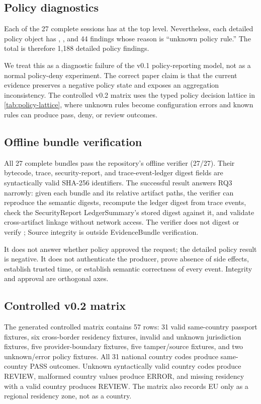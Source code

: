 \subsection{Policy diagnostics}
Each of the 27 complete sessions has  at the top
level.  Nevertheless, each detailed policy object has
, , and 44 findings whose
reason is ``unknown policy rule.''  The total is therefore 1,188 detailed
policy findings.

We treat this as a diagnostic failure of the v0.1 policy-reporting model, not
as a normal policy-deny experiment.  The correct paper claim is that the
current evidence preserves a negative policy state and exposes an aggregation
inconsistency.  The controlled v0.2 matrix uses the typed policy decision
lattice in \cref{tab:policy-lattice}, where unknown rules become configuration
errors and known rules can produce pass, deny, or review outcomes.

\subsection{Offline bundle verification}
All 27 complete bundles pass the repository's offline verifier (27/27).  Their
bytecode, trace, security-report, and trace-event-ledger digest fields are
syntactically valid SHA-256 identifiers.  The successful result answers RQ3
narrowly: given each bundle and its relative artifact paths, the verifier can
reproduce the semantic digests, recompute the ledger digest from trace events,
check the SecurityReport LedgerSummary's stored digest against it, and validate
cross-artifact linkage without network access.  The verifier does not digest
or verify ; Source integrity is outside EvidenceBundle
verification.

It does not answer whether policy approved the request; the detailed policy
result is negative.  It does not authenticate the producer, prove absence of
side effects, establish trusted time, or establish semantic correctness of
every event.  Integrity and approval are orthogonal axes.

\subsection{Controlled v0.2 matrix}
The generated controlled matrix contains 57 rows: 31 valid same-country
passport fixtures, six cross-border residency fixtures, invalid and unknown
jurisdiction fixtures, five provider-boundary fixtures, five tamper/source
fixtures, and two unknown/error policy fixtures.  All 31 national country codes
produce same-country PASS outcomes.  Unknown syntactically valid country codes
produce REVIEW, malformed country values produce ERROR, and missing residency
with a valid country produces REVIEW.  The matrix also records EU only as a
regional residency zone, not as a country.

